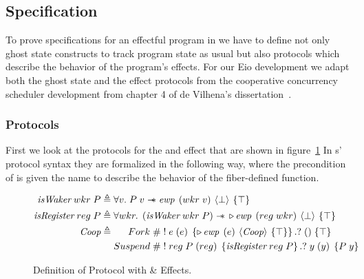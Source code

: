 \subsection{Specification}
\label{sec:sched-spec}

To prove specifications for an effectful program in \hazel{} we have to define not only ghost state constructs to track program state as usual but also protocols which describe the behavior of the program's effects.
For our Eio development we adapt both the ghost state and the effect protocols from the cooperative concurrency scheduler development from chapter 4 of de Vilhena's dissertation~\cite{de2022proof}.

\subsubsection{Protocols}
\label{sec:sched-spec-protocols}

First we look at the protocols for the \efork{} and \esuspend{} effect that are shown in figure~\ref{fig:coop-protocol-simpl}
In \hazel{}s' protocol syntax they are formalized in the following way, where the precondition of \esuspend{} is given the name \gsIsReg{} to describe the behavior of the fiber-defined  function.

\begin{figure}[ht]
  \begin{align*}
    \gsIsWaker{}\; wkr\; P & \triangleq \forall v.   \;  P\; v \wand{} \ewp{wkr\; v}{\bot}{\top}                                                                       \\
    \gsIsReg{}\; reg\; P   & \triangleq \forall wkr. \; \left( \gsIsWaker{}\; wkr\; P \right) \wand{} \later \ewp{reg\; wkr}{\bot}{\top}                               \\
    \proto{}               & \triangleq \begin{aligned}[t]
                                          Fork\;    & \# \; !\; e\; (e)\; \left\{\later \ewp{e}{\proto{}}{\top}\right\}. ?\; ()\; \{ \top \}               \\
                                          Suspend\; & \# \; !\; reg\; P\; (reg)\; \left\{\gsIsReg{}\; reg\; P\right\}.?\; y\; (y)\; \left\{ P\; y \right\}
                                        \end{aligned}
  \end{align*}
  \caption{Definition of \proto{} Protocol with \efork{} \& \esuspend{} Effects.}
  \label{fig:coop-protocol-simpl}
\end{figure}

